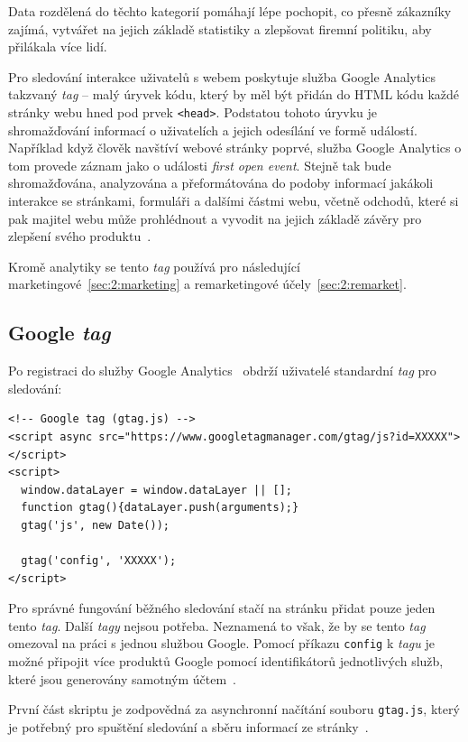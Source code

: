 Data rozdělená do těchto kategorií pomáhají lépe pochopit, co přesně zákazníky zajímá, vytvářet na jejich základě statistiky a zlepšovat firemní politiku, aby přilákala více lidí.

Pro sledování interakce uživatelů s webem poskytuje služba Google Analytics takzvaný {\it tag} -- malý úryvek kódu, který by měl být přidán do HTML kódu každé stránky webu hned pod prvek \texttt{<head>}. Podstatou tohoto úryvku je shromažďování informací o uživatelích a jejich odesílání ve formě událostí. Například když člověk navštíví webové stránky poprvé, služba Google Analytics o tom provede záznam jako o události {\it first open event}. Stejně tak bude shromažďována, analyzována a přeformátována do podoby informací jakákoli interakce se stránkami, formuláři a dalšími částmi webu, včetně odchodů, které si pak majitel webu může prohlédnout a vyvodit na jejich základě závěry pro zlepšení svého produktu~\cite{analitic}.

Kromě analytiky se tento {\it tag} používá pro následující marketingové~\ref{sec:2:marketing} a remarketingové účely~\ref{sec:2:remarket}.
\bigskip
\subsection*{Google {\it tag}}
Po registraci do služby Google Analytics~\cite{accountA} obdrží uživatelé standardní {\it tag} pro sledování:
\bigskip
\bigskip
\bigskip
\bigskip
\bigskip
\bigskip
\bigskip
\begin{lstlisting}[caption=Google Tag Script, label=google-tag-script]
<!-- Google tag (gtag.js) -->
<script async src="https://www.googletagmanager.com/gtag/js?id=XXXXX"></script>
<script>
  window.dataLayer = window.dataLayer || [];
  function gtag(){dataLayer.push(arguments);}
  gtag('js', new Date());

  gtag('config', 'XXXXX');
</script>
\end{lstlisting}

Pro správné fungování běžného sledování stačí na stránku přidat pouze jeden tento {\it tag}. Další {\it tagy} nejsou potřeba. Neznamená to však, že by se tento {\it tag} omezoval na práci s jednou službou Google. Pomocí příkazu \texttt{config} k {\it tagu} je možné připojit více produktů Google pomocí identifikátorů jednotlivých služb, které jsou generovány samotným účtem~\cite{gtag}.

První část skriptu je zodpovědná za asynchronní načítání souboru \texttt{gtag.js}, který je potřebný pro spuštění sledování a sběru informací ze stránky~\cite{gtag}.

